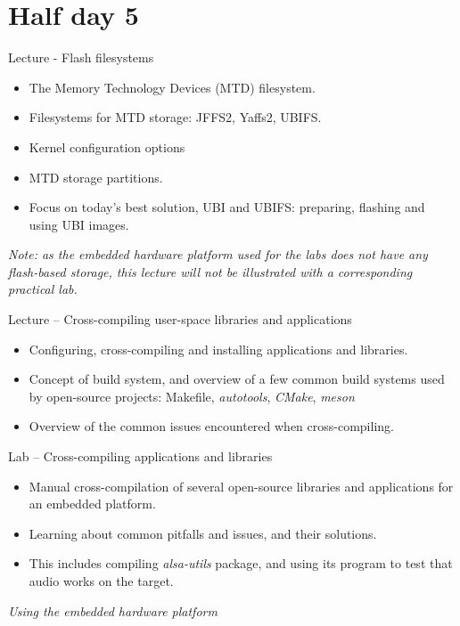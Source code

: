 \documentclass[a4paper,12pt,obeyspaces,spaces,hyphens]{article}
\begin{document}
\section{Half day 5}

\feagendaonecolumn
{Lecture - Flash filesystems}
{
  \begin{itemize}
  \item The Memory Technology Devices (MTD) filesystem.
  \item Filesystems for MTD storage: JFFS2, Yaffs2, UBIFS.
  \item Kernel configuration options
  \item MTD storage partitions.
  \item Focus on today's best solution, UBI and UBIFS:
	preparing, flashing and using UBI images.
  \end{itemize}

  \vspace{0.5cm}

  {\em Note: as the embedded hardware platform used for the labs does
    not have any flash-based storage, this lecture will not be
    illustrated with a corresponding practical lab.}
}

\feagendatwocolumn
{Lecture – Cross-compiling user-space libraries and applications}
{
  \begin{itemize}
  \item Configuring, cross-compiling and installing applications and
    libraries.
  \item Concept of build system, and overview of a few common build
    systems used by open-source projects: Makefile, {\em autotools},
    {\em CMake}, {\em meson}
  \item Overview of the common issues encountered when
    cross-compiling.
  \end{itemize}
}
{Lab – Cross-compiling applications and libraries}
{
  \begin{itemize}
  \item Manual cross-compilation of several open-source libraries and
    applications for an embedded platform.
  \item Learning about common pitfalls and issues, and their
    solutions.
  \item This includes compiling {\em alsa-utils} package,
    and using its  program to test that
    audio works on the target.
  \end{itemize}

  \vspace{0.5cm}
  {\em Using the embedded hardware platform}
}
\end{document}
